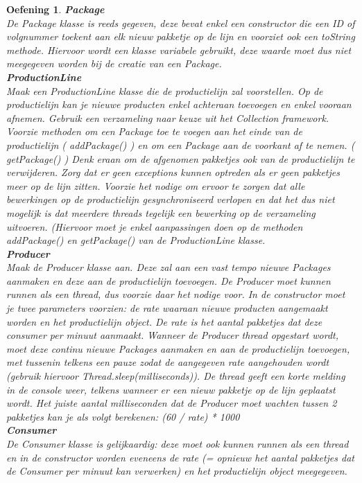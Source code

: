 \documentclass{tstextbook}
\newtheorem{envoefening}{Oefening}[chapter]
\newenvironment{oefening}
               {\begin{boxexercise}\begin{envoefening}}
               {\end{envoefening}\end{boxexercise}}
\begin{document}
\begin{oefening}
\textbf{Package}\\
De Package klasse is reeds gegeven, deze bevat enkel een constructor die een ID of volgnummer toekent aan elk nieuw pakketje op de lijn en voorziet ook een toString methode. Hiervoor wordt een klasse variabele gebruikt, deze waarde moet dus niet meegegeven worden bij de creatie van een Package.
\\
\textbf{ProductionLine}\\
Maak een ProductionLine klasse die de productielijn zal voorstellen. Op de productielijn kan je nieuwe producten enkel achteraan toevoegen en enkel vooraan afnemen. Gebruik een verzameling naar keuze uit het Collection framework. Voorzie methoden om een Package toe te voegen aan het einde van de productielijn ( addPackage() ) en om een Package aan de voorkant af te nemen. ( getPackage() ) Denk eraan om de afgenomen pakketjes ook van de productielijn te verwijderen. 
Zorg dat er geen exceptions kunnen optreden als er geen pakketjes meer op de lijn zitten.
Voorzie het nodige om ervoor te zorgen dat alle bewerkingen op de productielijn gesynchroniseerd verlopen en dat het dus niet mogelijk is dat meerdere threads tegelijk een bewerking op de verzameling uitvoeren. (Hiervoor moet je enkel aanpassingen doen op de methoden addPackage() en getPackage() van de ProductionLine klasse.
\\
\textbf{Producer}\\
Maak de Producer klasse aan. Deze zal aan een vast tempo nieuwe Packages aanmaken en deze aan de productielijn toevoegen. De Producer moet kunnen runnen als een thread, dus voorzie daar het nodige voor. In de constructor moet je twee parameters voorzien: de rate waaraan nieuwe producten aangemaakt worden en het productielijn object. De rate is het aantal pakketjes dat deze consumer per minuut aanmaakt.
Wanneer de Producer thread opgestart wordt, moet deze continu nieuwe Packages aanmaken en aan de productielijn toevoegen, met tussenin telkens een pauze zodat de aangegeven rate aangehouden wordt (gebruik hiervoor Thread.sleep(milliseconds)). De thread geeft een korte melding in de console weer, telkens wanneer er een nieuw pakketje op de lijn geplaatst wordt.
Het juiste aantal milliseconden dat de Producer moet wachten tussen 2 pakketjes kan je als volgt berekenen: (60 / rate) * 1000
\\
\textbf{Consumer}\\
De Consumer klasse is gelijkaardig: deze moet ook kunnen runnen als een thread en in de constructor worden eveneens de rate (= opnieuw het aantal pakketjes dat de Consumer per minuut kan verwerken) en het productielijn object meegegeven.

\end{oefening}
\end{document}
